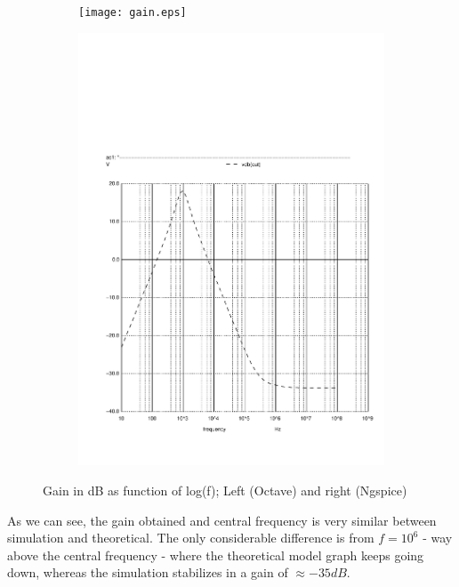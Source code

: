 \begin{figure}[h]
    \centering
    \begin{subfigure}{0.5\textwidth}
      \texttt{[image: gain.eps]}
    \end{subfigure}
    \begin{subfigure}{0.4\textwidth}
      \includegraphics[width=\linewidth, clip]{gain.pdf}
    \end{subfigure}
    \caption{Gain in dB as function of log(f); Left (Octave) and right (Ngspice) }
    \label{fig:argTOct}
\end{figure}

As we can see, the gain obtained and central frequency is very similar between simulation and theoretical. The only considerable difference is from $f = 10^6$ - way above the central frequency -
where the theoretical model graph keeps going down, whereas the simulation stabilizes in a gain of $\approx -35dB$.   

